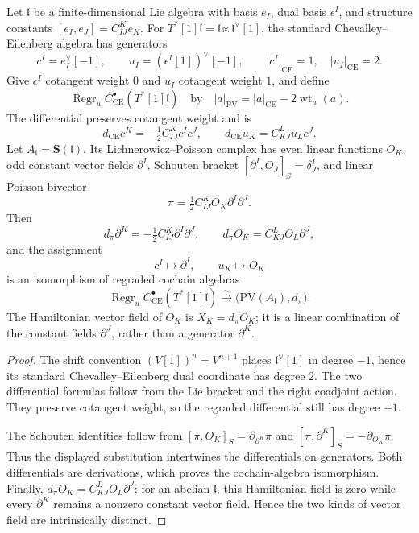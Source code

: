 \begin{lem}
\label{lem:app-sign-ce-pv}
  Let \(\mathfrak l\) be a finite-dimensional Lie algebra with basis
  \(e_I\), dual basis \(\epsilon^I\), and structure constants
  \([e_I,e_J]=C^K_{IJ}e_K\).  For
  \(T^*[1]\mathfrak l=\mathfrak l\ltimes\mathfrak l^\vee[1]\), the
  standard Chevalley--Eilenberg algebra has generators
  \[
    c^I=e_I^\vee[-1],\qquad u_I=(\epsilon^I[1])^\vee[-1],
    \qquad |c^I|_{\mathrm{CE}}=1,\quad |u_I|_{\mathrm{CE}}=2.
  \]
  Give \(c^I\) cotangent weight \(0\) and \(u_I\) cotangent weight \(1\),
  and define
  \[
    \operatorname{Regr}_u C^\bullet_{\mathrm{CE}}(T^*[1]\mathfrak l)
    \quad\text{by}\quad
    |a|_{\mathrm{PV}}=|a|_{\mathrm{CE}}-2\operatorname{wt}_u(a).
  \]
  The differential preserves cotangent weight and is
  \[
    d_{\mathrm{CE}}c^K=-\tfrac12 C^K_{IJ}c^Ic^J,\qquad
    d_{\mathrm{CE}}u_K=C^L_{KJ}u_Lc^J.
  \]
  Let \(A_{\mathfrak l}=\mathbf S(\mathfrak l)\).  Its
  Lichnerowicz--Poisson complex has even linear functions \(O_K\), odd
  constant vector fields \(\partial^I\), Schouten bracket
  \([\partial^I,O_J]_S=\delta^I_J\), and linear Poisson bivector
  \[
    \pi=\tfrac12 C^K_{IJ}O_K\partial^I\partial^J.
  \]
  Then
  \[
    d_\pi\partial^K=-\tfrac12 C^K_{IJ}\partial^I\partial^J,
    \qquad
    d_\pi O_K=C^L_{KJ}O_L\partial^J,
  \]
  and the assignment
  \[
    c^I\longmapsto\partial^I,\qquad u_K\longmapsto O_K
  \]
  is an isomorphism of regraded cochain algebras
  \[
    \operatorname{Regr}_u C^\bullet_{\mathrm{CE}}(T^*[1]\mathfrak l)
      \xrightarrow{\sim}
    \bigl(\mathrm{PV}(A_{\mathfrak l}),d_\pi\bigr).
  \]
  The Hamiltonian vector field of \(O_K\) is
  \(X_K=d_\pi O_K\); it is a linear combination of the constant fields
  \(\partial^J\), rather than a generator \(\partial^K\).
\end{lem}

\begin{proof}
  The shift convention \((V[1])^n=V^{n+1}\) places
  \(\mathfrak l^\vee[1]\) in degree \(-1\), hence its standard
  Chevalley--Eilenberg dual coordinate has degree \(2\).  The two
  differential formulas follow from the Lie bracket and the right
  coadjoint action.  They preserve cotangent weight, so the regraded
  differential still has degree \(+1\).

  The Schouten identities follow from
  \([\pi,O_K]_S=\partial_{\partial^K}\pi\) and
  \([\pi,\partial^K]_S=-\partial_{O_K}\pi\).  Thus the displayed
  substitution intertwines the differentials on generators.  Both
  differentials are derivations, which proves the cochain-algebra
  isomorphism.  Finally,
  \(d_\pi O_K=C^L_{KJ}O_L\partial^J\); for an abelian
  \(\mathfrak l\), this Hamiltonian field is zero while every
  \(\partial^K\) remains a nonzero constant vector field.  Hence the two
  kinds of vector field are intrinsically distinct.
\end{proof}

